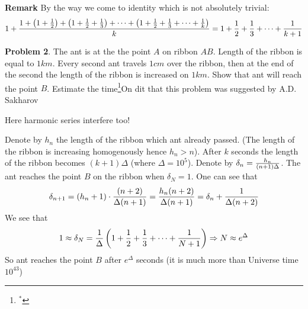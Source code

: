 {\bf Remark} By the way we come to identity which is not
absolutely trivial:
             $$
 1+{1+\left(1+{1\over 2}\right)+\left(1+{1\over 2}+{1\over 3}\right)+
    \dots+\left(1+{1\over 2}+{1\over 3}+\dots+{1\over k}\right)\over
    k}=1+{1\over 2}+{1\over 3}+\dots+{1\over k+1}
             $$


{\bf Problem 2}.  The ant is at the  the point $A$ on ribbon $AB$. Length of the ribbon is equal to
$1km$.  Every second ant travels $1cm$ over the ribbon, then at the end of the second the length of the ribbon
is increased on $1km$.  Show that ant will reach the point $B$. Estimate the time\footnote{$^*$}{On dit that
this problem was suggested by A.D. Sakharov}

 Here harmonic series interfere too!

  Denote by $h_n$ the length of the ribbon which ant already passed.
  (The length of the ribbon is increasing homogenously hence $h_n>n$).
   After $k$ seconds the length of the ribbon becomes $(k+1)\Delta$ (where $\Delta=10^5$).
   Denote by $\delta_n={h_n\over (n+1)\Delta}$.
   The ant reaches the point $B$ on the ribbon when $\delta_N=1$.
       One can see that
                $$
   \delta_{n+1}=\left(h_n+1\right)\cdot {(n+2)\over \Delta(n+1)}={h_n(n+2)\over \Delta(n+1)}=
   \delta_n+{1\over\Delta( n+2)}
                $$
We see that
                $$
  1\approx \delta_N={1\over \Delta}\left(1+{1\over 2}+{1\over 3}+\dots+{1\over N+1}\right)\Rightarrow
  N\approx e^{\Delta}
                $$
 So ant reaches the point $B$ after $e^\Delta$ seconds (it is much more than Universe time $10^{43}$)

 \bye
